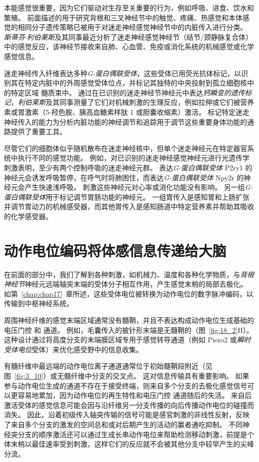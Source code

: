 本能感觉很重要，因为它们驱动对生存至关重要的行为，例如呼吸、进食、饮水和繁殖。
前面描述的用于研究背根和三叉神经节中的触觉、疼痛、热感觉和本体感觉的相同分子遗传策略已被用于对迷走神经感觉神经节中的内脏传入进行分类。
\textit{斯蒂芬$\cdot$利伯莱斯}及其同事最近分析了迷走神经感觉神经节（结节/颈静脉复合体）中的感觉反应，该神经节接收来自肺、心血管、免疫或消化系统的机械感觉或化学感觉信息。


迷走神经传入纤维表达多种\textit{G-蛋白偶联受体}，这些受体已用荧光抗体标记，以识别其在特定内脏中的外周感觉受体位点，并标记其独特的中央投射到孤立细胞核中的特定区域 髓质束中。
通过在已识别的迷走神经节神经元中表达\textit{钙瞬变的遗传标记}，\textit{利伯莱斯}及其同事测量了它们对机械刺激的生理反应，例如拉伸或它们被营养素或胃激素（5-羟色胺、胰高血糖素样肽 1 或胆囊收缩素）激活。
标记特定迷走神经传入的能力为分析内脏功能的神经调节和追踪用于调节这些重要身体功能的通路提供了重要工具。


尽管它们的细胞体似乎随机散布在迷走神经核中，但单个迷走神经元在特定器官系统中执行不同的感觉功能。
例如，对已识别的迷走神经感觉神经元进行光遗传学刺激表明，至少有两个控制呼吸的迷走神经元群。
表达\textit{G-蛋白偶联受体} P2ry1 的神经元会诱发呼吸暂停，在呼气时将肺困住，而表达\textit{G-蛋白偶联受体} Npy2r 的神经元会产生快速浅呼吸。
刺激这些神经元对心率或消化功能没有影响。
另一组\textit{G-蛋白偶联受体}用于标记调节胃肠功能的神经元。
一组胃传入是感知胃和上肠扩张并调节胃动力的机械感受器，而其他胃传入是感知肠道中特定营养素并帮助其吸收的化学感受器。



\section{动作电位编码将体感信息传递给大脑}

在前面的部分中，我们了解到各种刺激，如机械力、温度和各种化学物质，与\textit{背根神经节}神经元远端轴突末端的受体分子相互作用，产生感觉末梢的局部去极化。
如第~\ref{chap:chap17}~章所述，这些受体电位被转换为动作电位的数字脉冲编码，以传输到中枢神经系统。


周围神经纤维的感觉末端区域通常没有髓鞘，并且不表达构成动作电位生成基础的电压门控  和  通道。
例如，毛囊传入的披针形末端是无髓鞘的（图~\ref{fig:18_2}H）。
这种设计通过将高度分支的末端膜区域专用于感觉转导通道（例如 Piezo2 或\textit{瞬时受体电位}受体）来优化感受野中的信息收集。


有髓纤维中最远端的动作电位离子通道通常位于初始髓鞘段附近（见图~\ref{fig:3_10}）或无髓纤维中分支的交叉点。
这对信息传输具有重要影响。
如果参与动作电位生成的通道不存在于接受终端，则来自多个分支的去极化感觉信号可以更容易地累加，因为动作电位的再生特性和电压门控  通道随后的失活。
来自后激活受体的感觉信息可能会因与沿纤维另一分支传播的向后传播动作电位的碰撞而消失。
因此，沿着初级传入轴突传输的信号可能是感官刺激的非线性反射，反映了来自多个分支的激发的空间总和或对后期产生的活动的赢者通吃抑制。
不同神经突分支的顺序激活还可以通过生成长串动作电位来帮助检测移动刺激，前提是个体末梢以最佳速率受到刺激，这样它们的反应就不会被其他分支中较早产生的尖峰分流。


